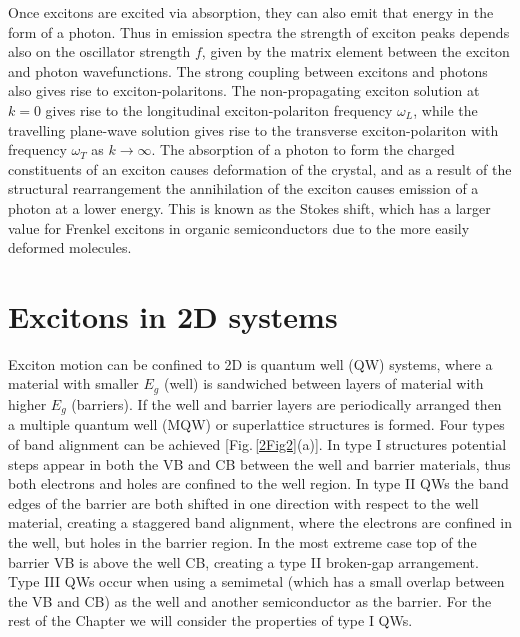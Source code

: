 Once excitons are excited via absorption, they can also emit that energy in the form of a photon. Thus in emission spectra the strength of exciton peaks depends also on the oscillator strength $f$, given by the matrix element between the exciton and photon wavefunctions. The strong coupling between excitons and photons also gives rise to exciton-polaritons. The non-propagating exciton solution at $k=0$ gives rise to the longitudinal exciton-polariton frequency $\omega_L$, while the travelling plane-wave solution gives rise to the transverse exciton-polariton with frequency $\omega_T$ as $k\rightarrow \infty$. The absorption of a photon to form the charged constituents of an exciton causes deformation of the crystal, and as a result of the structural rearrangement the annihilation of the exciton causes emission of a photon at a lower energy. This is known as the Stokes shift, which has a larger value for Frenkel excitons in organic semiconductors due to the more easily deformed molecules.

\section{Excitons in 2D systems}
Exciton motion can be confined to 2D is quantum well (QW) systems, where a material with smaller $E_g$ (well) is sandwiched between layers of material with higher $E_g$ (barriers). If the well and barrier layers are periodically arranged then a multiple quantum well (MQW) or superlattice structures is formed. Four types of band alignment can be achieved [Fig.\,\ref{2Fig2}(a)]. In type I structures potential steps appear in both the VB and CB between the well and barrier materials, thus both electrons and holes are confined to the well region. In type II QWs the band edges of the barrier are both shifted in one direction with respect to the well material, creating a staggered band alignment, where the electrons are confined in the well, but holes in the barrier region. In the most extreme case top of the barrier VB is above the well CB, creating a type II broken-gap arrangement. Type III QWs occur when using a semimetal (which has a small overlap between the VB and CB) as the well and another semiconductor as the barrier. For the rest of the Chapter we will consider the properties of type I QWs.

